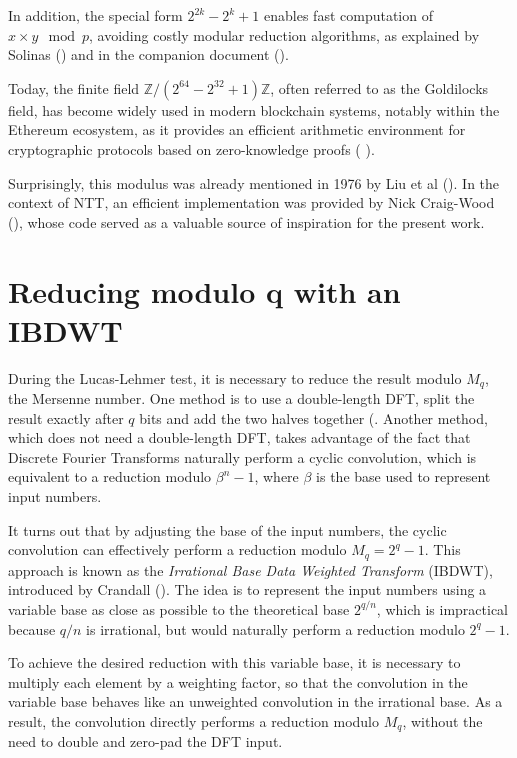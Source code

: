 \documentclass{article}
\begin{document}
In addition, the special form $2^{2k} - 2^k + 1$ enables fast computation of $x\times y \mod p$, avoiding costly modular reduction algorithms, as explained by Solinas (\cite{Sol99}) and in the companion document (\cite{LucasNTT_documents}).

Today, the finite field $\mathbb{Z}/(2^{64} - 2^{32} + 1)\mathbb{Z}$, often referred to as the Goldilocks field, has become widely used in modern blockchain systems, notably within the Ethereum ecosystem, as it provides an efficient arithmetic environment for cryptographic protocols based on zero-knowledge proofs (\cite{zk1} \cite{zk2} \cite{zk3}).
 
Surprisingly, this modulus was already mentioned in 1976 by Liu et al (\cite{LRT76}). In the context of NTT, an efficient implementation was provided by Nick Craig-Wood (\cite{NCW}), whose code served as a valuable source of inspiration for the present work.

\section{Reducing modulo q with an IBDWT}

During the Lucas-Lehmer test, it is necessary to reduce the result modulo $M_q$, the Mersenne number. One method is to use a double-length DFT, split the result exactly after $q$ bits and add the two halves together (\cite{Sol99}. Another method, which does not need a double-length DFT, takes advantage of the fact that Discrete Fourier Transforms naturally perform a cyclic convolution, which is equivalent to a reduction modulo $\beta^n - 1$, where $\beta$ is the base used to represent input numbers.

It turns out that by adjusting the base of the input numbers, the cyclic convolution can effectively perform a reduction modulo $M_q = 2^q - 1$. This approach is known as the \textit{Irrational Base Data Weighted Transform} (IBDWT), introduced by Crandall (\cite{CF94}). The idea is to represent the input numbers using a variable base as close as possible to the theoretical base $2^{q/n}$, which is impractical because $q/n$ is irrational, but would naturally perform a reduction modulo $2^q - 1$.

To achieve the desired reduction with this variable base, it is necessary to multiply each element by a weighting factor, so that the convolution in the variable base behaves like an unweighted convolution in the irrational base. As a result, the convolution directly performs a reduction modulo $M_q$, without the need to double and zero-pad the DFT input.
\end{document}

